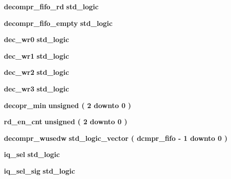 \begin{DoxyCompactItemize}
\item 
{\bf decompr\+\_\+fifo\+\_\+rd} {\bfseries \textcolor{comment}{std\+\_\+logic}\textcolor{vhdlchar}{ }} 
\item 
{\bf decompr\+\_\+fifo\+\_\+empty} {\bfseries \textcolor{comment}{std\+\_\+logic}\textcolor{vhdlchar}{ }} 
\item 
{\bf dec\+\_\+wr0} {\bfseries \textcolor{comment}{std\+\_\+logic}\textcolor{vhdlchar}{ }} 
\item 
{\bf dec\+\_\+wr1} {\bfseries \textcolor{comment}{std\+\_\+logic}\textcolor{vhdlchar}{ }} 
\item 
{\bf dec\+\_\+wr2} {\bfseries \textcolor{comment}{std\+\_\+logic}\textcolor{vhdlchar}{ }} 
\item 
{\bf dec\+\_\+wr3} {\bfseries \textcolor{comment}{std\+\_\+logic}\textcolor{vhdlchar}{ }} 
\item 
{\bf decopr\+\_\+min} {\bfseries \textcolor{comment}{unsigned}\textcolor{vhdlchar}{ }\textcolor{vhdlchar}{(}\textcolor{vhdlchar}{ }\textcolor{vhdlchar}{ } \textcolor{vhdldigit}{2} \textcolor{vhdlchar}{ }\textcolor{keywordflow}{downto}\textcolor{vhdlchar}{ }\textcolor{vhdlchar}{ } \textcolor{vhdldigit}{0} \textcolor{vhdlchar}{ }\textcolor{vhdlchar}{)}\textcolor{vhdlchar}{ }} 
\item 
{\bf rd\+\_\+en\+\_\+cnt} {\bfseries \textcolor{comment}{unsigned}\textcolor{vhdlchar}{ }\textcolor{vhdlchar}{(}\textcolor{vhdlchar}{ }\textcolor{vhdlchar}{ } \textcolor{vhdldigit}{2} \textcolor{vhdlchar}{ }\textcolor{keywordflow}{downto}\textcolor{vhdlchar}{ }\textcolor{vhdlchar}{ } \textcolor{vhdldigit}{0} \textcolor{vhdlchar}{ }\textcolor{vhdlchar}{)}\textcolor{vhdlchar}{ }} 
\item 
{\bf decompr\+\_\+wusedw} {\bfseries \textcolor{comment}{std\+\_\+logic\+\_\+vector}\textcolor{vhdlchar}{ }\textcolor{vhdlchar}{(}\textcolor{vhdlchar}{ }\textcolor{vhdlchar}{ }\textcolor{vhdlchar}{ }\textcolor{vhdlchar}{ }{\bfseries {\bf dcmpr\+\_\+fifo}} \textcolor{vhdlchar}{-\/}\textcolor{vhdlchar}{ } \textcolor{vhdldigit}{1} \textcolor{vhdlchar}{ }\textcolor{keywordflow}{downto}\textcolor{vhdlchar}{ }\textcolor{vhdlchar}{ } \textcolor{vhdldigit}{0} \textcolor{vhdlchar}{ }\textcolor{vhdlchar}{)}\textcolor{vhdlchar}{ }} 
\item 
{\bf iq\+\_\+sel} {\bfseries \textcolor{comment}{std\+\_\+logic}\textcolor{vhdlchar}{ }} 
\item 
{\bf iq\+\_\+sel\+\_\+sig} {\bfseries \textcolor{comment}{std\+\_\+logic}\textcolor{vhdlchar}{ }} 
\item 

\end{DoxyCompactItemize}
